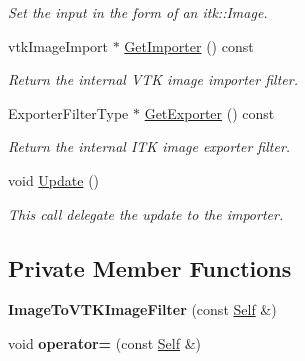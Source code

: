 \begin{DoxyCompactItemize}
\begin{DoxyCompactList}\small\item\em Set the input in the form of an itk::Image. \item\end{DoxyCompactList}\item 
vtkImageImport $\ast$ \hyperlink{classitk_1_1_image_to_v_t_k_image_filter_ac7662c1a28f84be41a998348122aa1e6}{GetImporter} () const 
\begin{DoxyCompactList}\small\item\em Return the internal VTK image importer filter. \item\end{DoxyCompactList}\item 
ExporterFilterType $\ast$ \hyperlink{classitk_1_1_image_to_v_t_k_image_filter_a28148e706b46194ef4a812873e67f8b7}{GetExporter} () const 
\begin{DoxyCompactList}\small\item\em Return the internal ITK image exporter filter. \item\end{DoxyCompactList}\item 
\hypertarget{classitk_1_1_image_to_v_t_k_image_filter_ad852dddc5730024d756135faa6653158}{
void \hyperlink{classitk_1_1_image_to_v_t_k_image_filter_ad852dddc5730024d756135faa6653158}{Update} ()}
\label{classitk_1_1_image_to_v_t_k_image_filter_ad852dddc5730024d756135faa6653158}

\begin{DoxyCompactList}\small\item\em This call delegate the update to the importer. \item\end{DoxyCompactList}\end{DoxyCompactItemize}
\subsection*{Private Member Functions}
\begin{DoxyCompactItemize}
\item 
\hypertarget{classitk_1_1_image_to_v_t_k_image_filter_a9d02505a749f0e3a84ef3545d8e26d1b}{
{\bfseries ImageToVTKImageFilter} (const \hyperlink{classitk_1_1_image_to_v_t_k_image_filter}{Self} \&)}
\label{classitk_1_1_image_to_v_t_k_image_filter_a9d02505a749f0e3a84ef3545d8e26d1b}

\item 
\hypertarget{classitk_1_1_image_to_v_t_k_image_filter_a77dca048172100d69033d3c486009245}{
void {\bfseries operator=} (const \hyperlink{classitk_1_1_image_to_v_t_k_image_filter}{Self} \&)}
\label{classitk_1_1_image_to_v_t_k_image_filter_a77dca048172100d69033d3c486009245}

\end{DoxyCompactItemize}

